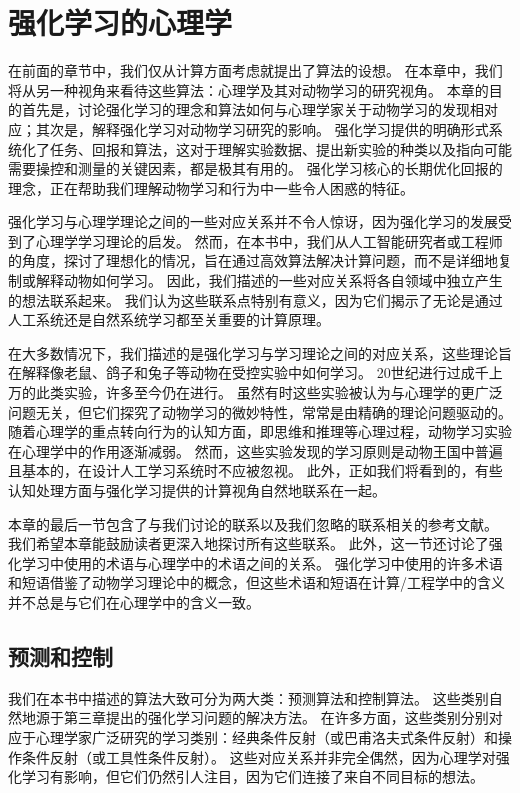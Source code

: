 

\chapter{强化学习的心理学} \label{chap:chap11}

在前面的章节中，我们仅从计算方面考虑就提出了算法的设想。
在本章中，我们将从另一种视角来看待这些算法：心理学及其对动物学习的研究视角。
本章的目的首先是，讨论强化学习的理念和算法如何与心理学家关于动物学习的发现相对应；其次是，解释强化学习对动物学习研究的影响。
强化学习提供的明确形式系统化了任务、回报和算法，这对于理解实验数据、提出新实验的种类以及指向可能需要操控和测量的关键因素，都是极其有用的。
强化学习核心的长期优化回报的理念，正在帮助我们理解动物学习和行为中一些令人困惑的特征。


强化学习与心理学理论之间的一些对应关系并不令人惊讶，因为强化学习的发展受到了心理学学习理论的启发。
然而，在本书中，我们从人工智能研究者或工程师的角度，探讨了理想化的情况，旨在通过高效算法解决计算问题，而不是详细地复制或解释动物如何学习。
因此，我们描述的一些对应关系将各自领域中独立产生的想法联系起来。
我们认为这些联系点特别有意义，因为它们揭示了无论是通过人工系统还是自然系统学习都至关重要的计算原理。


在大多数情况下，我们描述的是强化学习与学习理论之间的对应关系，这些理论旨在解释像老鼠、鸽子和兔子等动物在受控实验中如何学习。
20世纪进行过成千上万的此类实验，许多至今仍在进行。
虽然有时这些实验被认为与心理学的更广泛问题无关，但它们探究了动物学习的微妙特性，常常是由精确的理论问题驱动的。
随着心理学的重点转向行为的认知方面，即思维和推理等心理过程，动物学习实验在心理学中的作用逐渐减弱。
然而，这些实验发现的学习原则是动物王国中普遍且基本的，在设计人工学习系统时不应被忽视。
此外，正如我们将看到的，有些认知处理方面与强化学习提供的计算视角自然地联系在一起。


本章的最后一节包含了与我们讨论的联系以及我们忽略的联系相关的参考文献。
我们希望本章能鼓励读者更深入地探讨所有这些联系。
此外，这一节还讨论了强化学习中使用的术语与心理学中的术语之间的关系。
强化学习中使用的许多术语和短语借鉴了动物学习理论中的概念，但这些术语和短语在计算/工程学中的含义并不总是与它们在心理学中的含义一致。


\section{预测和控制}


我们在本书中描述的算法大致可分为两大类：预测算法和控制算法。
这些类别自然地源于第三章提出的强化学习问题的解决方法。
在许多方面，这些类别分别对应于心理学家广泛研究的学习类别：经典条件反射（或巴甫洛夫式条件反射）和操作条件反射（或工具性条件反射）。
这些对应关系并非完全偶然，因为心理学对强化学习有影响，但它们仍然引人注目，因为它们连接了来自不同目标的想法。


